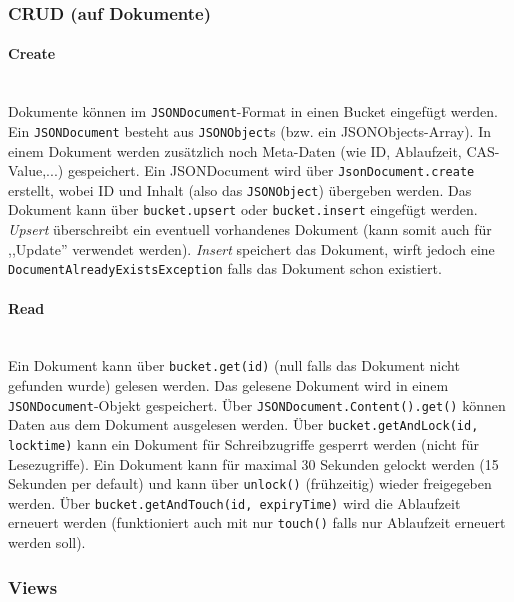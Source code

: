 
\subsubsection{CRUD (auf Dokumente)}

\paragraph{Create}\hspace{0pt}\\
Dokumente können im \texttt{JSONDocument}-Format in einen Bucket eingefügt werden. Ein \texttt{JSONDocument} besteht aus \texttt{JSONObject}s (bzw. ein JSONObjects-Array). In einem Dokument werden zusätzlich noch Meta-Daten (wie ID, Ablaufzeit, CAS-Value,...) gespeichert. Ein JSONDocument wird über \texttt{JsonDocument.create} erstellt, wobei ID und Inhalt (also das \texttt{JSONObject}) übergeben werden.
Das Dokument kann über \texttt{bucket.upsert} oder \texttt{bucket.insert} eingefügt werden. \textit{Upsert} überschreibt ein eventuell vorhandenes Dokument (kann somit auch für ,,Update'' verwendet werden). \textit{Insert} speichert das Dokument, wirft jedoch eine \texttt{DocumentAlreadyExistsException} falls das Dokument schon existiert.

\paragraph{Read}\hspace{0pt}\\
Ein Dokument kann über \texttt{bucket.get(id)} (null falls das Dokument nicht gefunden wurde) gelesen werden. Das gelesene Dokument wird in einem \texttt{JSONDocument}-Objekt gespeichert. 
Über \texttt{JSONDocument.Content().get()} können Daten aus dem Dokument ausgelesen werden. 
Über \texttt{bucket.getAndLock(id, locktime)} kann ein Dokument für Schreibzugriffe gesperrt werden (nicht für Lesezugriffe). Ein Dokument kann für maximal 30 Sekunden gelockt werden (15 Sekunden per default) und kann über \texttt{unlock()} (frühzeitig) wieder freigegeben werden.
Über \texttt{bucket.getAndTouch(id, expiryTime)} wird die Ablaufzeit erneuert werden (funktioniert auch mit nur \texttt{touch()} falls nur Ablaufzeit erneuert werden soll). 

\subsubsection{Views}


